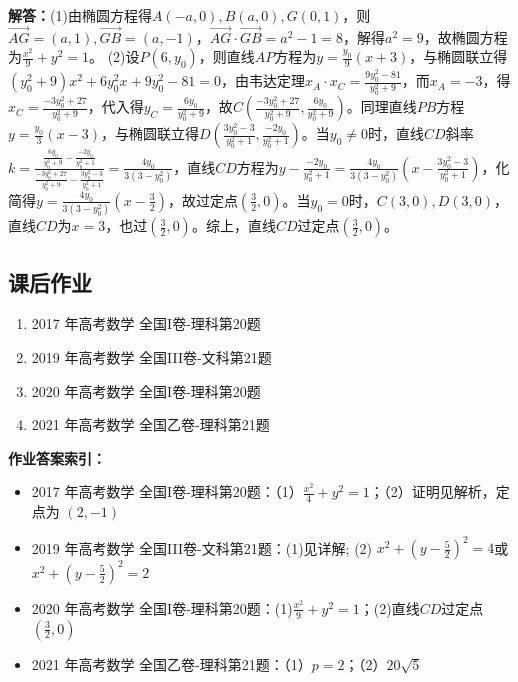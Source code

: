 \documentclass[UTF8,a4paper,11pt]{ctexart}
\begin{document}
\textbf{解答：}(1)由椭圆方程得$A(-a,0),B(a,0),G(0,1)$，则$\overrightarrow{AG}=(a,1),\overrightarrow{GB}=(a,-1)$，$\overrightarrow{AG}\cdot\overrightarrow{GB}=a^2-1=8$，解得$a^2=9$，故椭圆方程为$\frac{x^2}{9}+y^2=1$。
(2)设$P(6,y_0)$，则直线$AP$方程为$y=\frac{y_0}{9}(x+3)$，与椭圆联立得$(y_0^2+9)x^2+6y_0^2x+9y_0^2-81=0$，由韦达定理$x_A\cdot x_C=\frac{9y_0^2-81}{y_0^2+9}$，而$x_A=-3$，得$x_C=\frac{-3y_0^2+27}{y_0^2+9}$，代入得$y_C=\frac{6y_0}{y_0^2+9}$，故$C\left(\frac{-3y_0^2+27}{y_0^2+9},\frac{6y_0}{y_0^2+9}\right)$。同理直线$PB$方程$y=\frac{y_0}{3}(x-3)$，与椭圆联立得$D\left(\frac{3y_0^2-3}{y_0^2+1},\frac{-2y_0}{y_0^2+1}\right)$。当$y_0\neq0$时，直线$CD$斜率$k=\frac{\frac{6y_0}{y_0^2+9}-\frac{-2y_0}{y_0^2+1}}{\frac{-3y_0^2+27}{y_0^2+9}-\frac{3y_0^2-3}{y_0^2+1}}=\frac{4y_0}{3(3-y_0^2)}$，直线$CD$方程为$y-\frac{-2y_0}{y_0^2+1}=\frac{4y_0}{3(3-y_0^2)}\left(x-\frac{3y_0^2-3}{y_0^2+1}\right)$，化简得$y=\frac{4y_0}{3(3-y_0^2)}\left(x-\frac{3}{2}\right)$，故过定点$\left(\frac{3}{2},0\right)$。当$y_0=0$时，$C(3,0),D(3,0)$，直线$CD$为$x=3$，也过$\left(\frac{3}{2},0\right)$。综上，直线$CD$过定点$\left(\frac{3}{2},0\right)$。

\subsection*{课后作业}

\begin{enumerate}

\item 2017 年高考数学 全国I卷-理科第20题

\item 2019 年高考数学 全国III卷-文科第21题

\item 2020 年高考数学 全国I卷-理科第20题

\item 2021 年高考数学 全国乙卷-理科第21题

\end{enumerate}

\noindent\textbf{作业答案索引：}

\begin{itemize}

\item 2017 年高考数学 全国I卷-理科第20题：（1）$\frac{x^2}{4}+y^2=1$；（2）证明见解析，定点为 $(2,-1)$

\item 2019 年高考数学 全国III卷-文科第21题：(1)见详解; (2) $x^2+(y-\frac{5}{2})^2=4$或$x^2+(y-\frac{5}{2})^2=2$

\item 2020 年高考数学 全国I卷-理科第20题：(1)$\frac{x^2}{9}+y^2=1$；(2)直线$CD$过定点$\left(\frac{3}{2},0\right)$

\item 2021 年高考数学 全国乙卷-理科第21题：（1）$p=2$；（2）$20\sqrt{5}$

\end{itemize}
\end{document}
